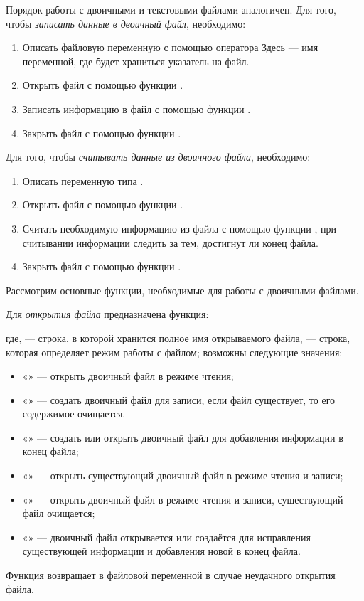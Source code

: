 Порядок работы с двоичными и текстовыми файлами аналогичен. Для того, чтобы
\emph{записать данные в двоичный файл}, необходимо:

\begin{enumerate}
\item Описать файловую переменную с помощью оператора
Здесь  --- имя переменной, где будет храниться указатель на файл.
\item Открыть файл с помощью функции .
\item Записать информацию в файл с помощью функции .
\item Закрыть файл с помощью функции .
\end{enumerate}
Для того, чтобы \emph{считывать данные из двоичного файла}, необходимо:

\begin{enumerate}
\item Описать переменную типа .
\item Открыть файл с помощью функции .
\item Считать необходимую информацию из файла с помощью функции , при считывании информации
следить за тем, достигнут ли конец файла.
\item Закрыть файл с помощью функции .
\end{enumerate}
Рассмотрим основные функции, необходимые для работы с двоичными файлами.

Для \emph{открытия файла} предназначена функция:

где,  --- строка, в которой хранится полное имя открываемого файла,  ---
строка, которая определяет режим работы с файлом; возможны следующие значения:
\begin{itemize}
\item[] «» --- открыть двоичный файл в режиме чтения;
\item[] «» --- создать двоичный файл для записи, если файл существует, то его содержимое очищается.
\item[] «» --- создать или открыть двоичный файл для добавления информации в конец файла;
\item[] «» --- открыть существующий двоичный файл в режиме чтения и записи;
\item[] «» --- открыть двоичный файл в режиме чтения и записи, существующий файл очищается;
\item[] «» --- двоичный файл открывается или создаётся для исправления существующей информации и
добавления новой в конец файла.
\end{itemize}
Функция  возвращает в файловой переменной  в случае неудачного открытия файла.


